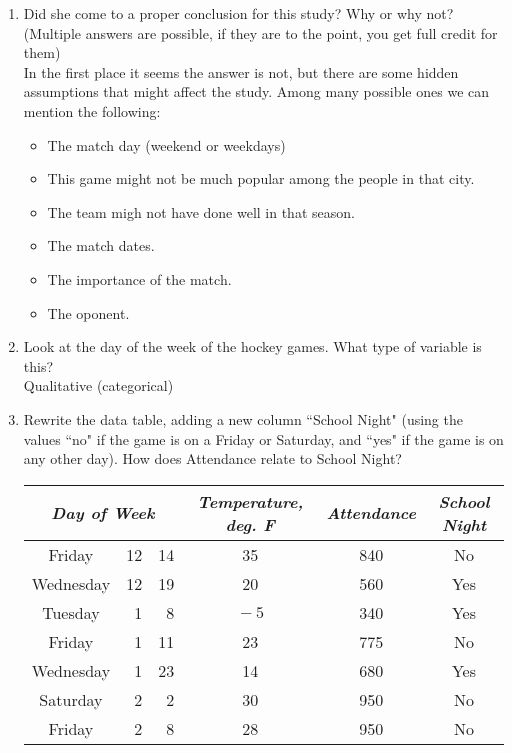 \documentclass[11pt]{article}\usepackage[]{graphicx}\usepackage[]{color}
\newcommand{\ben}{\begin{enumerate}}
\newcommand{\een}{\end{enumerate}}
\begin{document}
\begin{itemize}
\ben
\addtocounter{enumii}{2}
\item Did she come to a proper conclusion for this study? Why or why not?\\
(Multiple answers are possible, if they are to the point, you get full credit for them)\\
In the first place it seems the answer is not, but there are some hidden assumptions that might affect the study. Among many possible ones we can mention the following:\\
\begin{itemize}
\item The match day (weekend or weekdays)
\item This game might not be much popular among the people in that city.
\item The team migh not have done well in that season.
\item The match dates.
\item The importance of the match.
\item The oponent. 
\end{itemize}


\item Look at the day of the week of the hockey games.
What type of variable is this?\\
Qualitative (categorical)
 
\item 
Rewrite the data table, adding a new column ``School Night" (using the values ``no" if the game is on a Friday or Saturday, and ``yes" if the game is on any other day).
How does Attendance relate to School Night?
\hspace{1in}

\begin{tabular}{|cr@{/}r|c|c|c|} \hline
\multicolumn{3}{|c|}{\emph{Day of Week}} & \emph{Temperature, deg. F} & \emph{Attendance} & \emph{School Night}\\ \hline
Friday & 12&14 & 35 & 840 & No\\
Wednesday & 12&19 & 20 & 560& Yes \\
Tuesday & 1&8 & $\!-5$ & 340 & Yes\\
Friday & 1&11 & 23 & 775 & No\\
Wednesday & 1&23 & 14 & 680& Yes \\
Saturday & 2&2 & 30 & 950& No \\
Friday & 2&8 & 28 & 950 &No\\
\hline
\end{tabular}
\een


\end{itemize}
\end{document}
